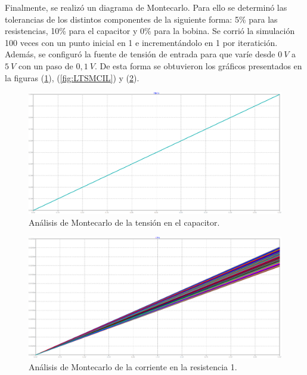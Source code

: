 \documentclass[a4paper]{article}
\begin{document}
Finalmente, se realizó un diagrama de Montecarlo. Para ello se determinó las tolerancias de los distintos componentes de la siguiente forma: 5\% para las resistencias, 10\% para el capacitor y 0\% para la bobina. Se corrió la simulación 100 veces con un punto inicial en 1 e incrementándolo en 1 por iteratición. Además, se configuró la fuente de tensión de entrada para que varíe desde $0 \ V$ a $5 \ V$ con un paso de $0,1 \ V$. De esta forma se obtuvieron los gráficos presentados en la figuras (\ref{fig:LTSMCVC}), (\ref{fig:LTSMCIL}) y (\ref{fig:LTSMCIR}).

\begin{figure}[H]
	\centering
	\includegraphics[width=\textwidth]{LTSpice-MC1-VC}
	\caption{Análisis de Montecarlo de la tensión en el capacitor.}
	\label{fig:LTSMCVC}
\end{figure}

\begin{figure}[H]
	\centering
	\includegraphics[width=\textwidth]{LTSpice-MC1-IR}
	\caption{Análisis de Montecarlo de la corriente en la resistencia 1.}
	\label{fig:LTSMCIR}
\end{figure}
\end{document}
